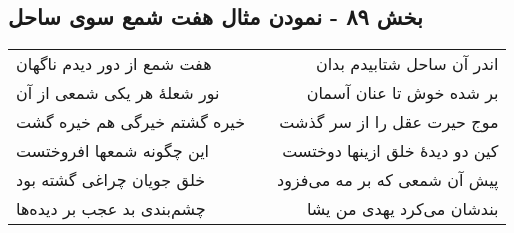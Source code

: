 \begin{center}
\section*{بخش ۸۹ - نمودن مثال هفت شمع سوی ساحل}
\label{sec:sh089}
\begin{longtable}{l p{0.5cm} r}
هفت شمع از دور دیدم ناگهان
&&
اندر آن ساحل شتابیدم بدان
\\
نور شعلهٔ هر یکی شمعی از آن
&&
بر شده خوش تا عنان آسمان
\\
خیره گشتم خیرگی هم خیره گشت
&&
موج حیرت عقل را از سر گذشت
\\
این چگونه شمعها افروختست
&&
کین دو دیدهٔ خلق ازینها دوختست
\\
خلق جویان چراغی گشته بود
&&
پیش آن شمعی که بر مه می‌فزود
\\
چشم‌بندی بد عجب بر دیده‌ها
&&
بندشان می‌کرد یهدی من یشا
\\
\end{longtable}
\end{center}
